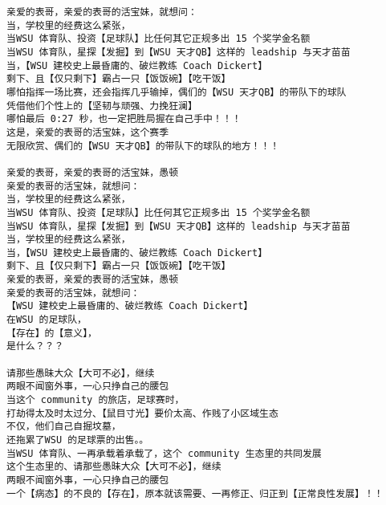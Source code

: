 \documentclass[9pt, b5paper]{article}
\begin{document}
\begin{verbatim}
亲爱的表哥，亲爱的表哥的活宝妹，就想问：
当，学校里的经费这么紧张，
当WSU 体育队、投资【足球队】比任何其它正规多出 15 个奖学金名额
当WSU 体育队，星探【发掘】到【WSU 天才QB】这样的 leadship 与天才苗苗
当，【WSU 建校史上最昏庸的、破烂教练 Coach Dickert】
剩下、且【仅只剩下】霸占一只【饭饭碗】【吃干饭】
哪怕指挥一场比赛，还会指挥几乎输掉，偶们的【WSU 天才QB】的带队下的球队
凭借他们个性上的【坚韧与顽强、力挽狂澜】
哪怕最后 0:27 秒，也一定把胜局握在自己手中！！！
这是，亲爱的表哥的活宝妹，这个赛季
无限欣赏、偶们的【WSU 天才QB】的带队下的球队的地方！！！

亲爱的表哥，亲爱的表哥的活宝妹，愚顿
亲爱的表哥的活宝妹，就想问：
当，学校里的经费这么紧张，
当WSU 体育队、投资【足球队】比任何其它正规多出 15 个奖学金名额
当WSU 体育队，星探【发掘】到【WSU 天才QB】这样的 leadship 与天才苗苗
当，学校里的经费这么紧张，
当，【WSU 建校史上最昏庸的、破烂教练 Coach Dickert】
剩下、且【仅只剩下】霸占一只【饭饭碗】【吃干饭】
亲爱的表哥，亲爱的表哥的活宝妹，愚顿
亲爱的表哥的活宝妹，就想问：
【WSU 建校史上最昏庸的、破烂教练 Coach Dickert】
在WSU 的足球队，
【存在】的【意义】，
是什么？？？

请那些愚昧大众【大可不必】，继续
两眼不闻窗外事，一心只挣自己的腰包
当这个 community 的旅店，足球赛时，
打劫得太及时太过分、【鼠目寸光】要价太高、作贱了小区域生态
不仅，他们自己自掘坟墓，
还拖累了WSU 的足球票的出售。。
当WSU 体育队、一再承载着承载了，这个 community 生态里的共同发展
这个生态里的、请那些愚昧大众【大可不必】，继续
两眼不闻窗外事，一心只挣自己的腰包
一个【病态】的不良的【存在】，原本就该需要、一再修正、归正到【正常良性发展】！！


\end{verbatim}
\end{document}
